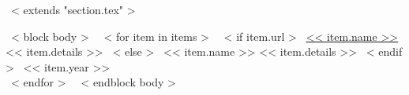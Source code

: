 ~< extends "section.tex" >~

~< block body >~
  ~< for item in items >~
    ~< if item.url >~
      \href{<< item.url >>}{<< item.name >>} << item.details >>
    ~< else >~
      << item.name >> << item.details >>
      ~< endif >~
    \hfill << item.year >> \\
  ~< endfor >~
~< endblock body >~
